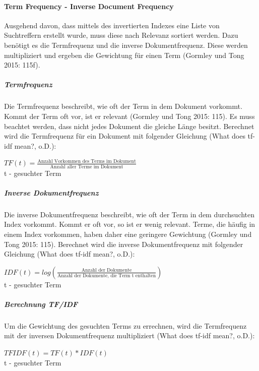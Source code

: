\documentclass[a4paper]{scrartcl}
\begin{document}
\paragraph{Term Frequency - Inverse Document Frequency}
Ausgehend davon, dass mittels des invertierten Indexes eine Liste von Suchtreffern erstellt wurde, muss diese nach Relevanz sortiert werden. Dazu benötigt es die Termfrequenz und die inverse Dokumentfrequenz. Diese werden multipliziert und ergeben die Gewichtung für einen Term (Gormley und Tong 2015: 115f). 

\subparagraph{Termfrequenz}
Die Termfrequenz beschreibt, wie oft der Term in dem Dokument vorkommt. Kommt der Term oft vor, ist er relevant (Gormley und Tong 2015: 115). Es muss beachtet werden, dass nicht jedes Dokument die gleiche Länge besitzt. Berechnet wird die Termfrequenz für ein Dokument mit folgender Gleichung (What does tf-idf mean?, o.D.):

\begin{center}
	
	$ TF(t) = \frac{\text{Anzahl Vorkommen des Terms im Dokument}}{\text{Anzahl aller Terme im Dokument}} $ \\
	t - gesuchter Term 	
	
\end{center}

\subparagraph{Inverse Dokumentfrequenz}
Die inverse Dokumentfrequenz beschreibt, wie oft der Term in dem durchsuchten Index vorkommt. Kommt er oft vor, so ist er wenig relevant. Terme, die häufig in einem Index vorkommen, haben daher eine geringere Gewichtung (Gormley und Tong 2015: 115). Berechnet wird die inverse Dokumentfrequenz mit folgender Gleichung (What does tf-idf mean?, o.D.):

\begin{center}
	
	$ IDF(t) = log( \frac{\text{Anzahl der Dokumente}}{\text{Anzahl der Dokumente, die Term t enthalten}} ) $ \\
	t - gesuchter Term 	
	
\end{center}


\subparagraph{Berechnung TF/IDF}
Um die Gewichtung des gesuchten Terms zu errechnen, wird die Termfrequenz mit der inversen Dokumentfrequenz multipliziert (What does tf-idf mean?, o.D.):

\begin{center}
	
	$ TFIDF(t) = TF(t) * IDF(t) $ \\
	t - gesuchter Term 	
	
\end{center}
\end{document}
